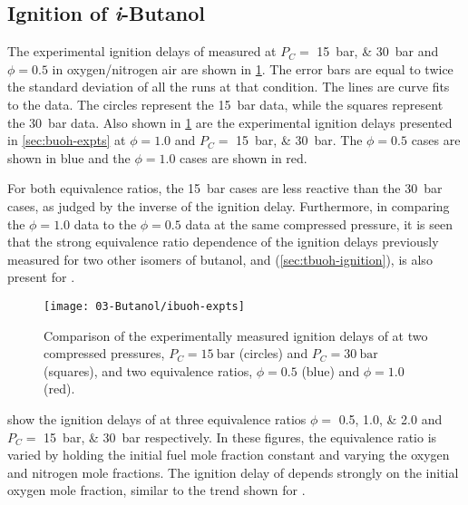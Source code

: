 \documentclass[../main.tex]{subfiles}
\begin{document}
\subsection{Ignition of \textit{i}-Butanol}
\label{sec:ibuoh-ignition}

The experimental ignition delays of \iBuOH{} measured at
$P_C=$ \SIlist{15;30}{\bar} and $\phi=0.5$ in oxygen/nitrogen air are shown in
\cref{fig:ibuoh-expts}. The error bars are equal to twice the standard
deviation of all the runs at that condition. The lines are curve fits to
the data. The circles represent the \SI{15}{\bar} data, while the
squares represent the \SI{30}{\bar} data. Also shown in
\cref{fig:ibuoh-expts} are the experimental ignition delays presented in
\cref{sec:buoh-expts} at $\phi=1.0$ and $P_C=$ \SIlist{15;30}{\bar}. The
$\phi=0.5$ cases are shown in blue and the $\phi=1.0$ cases are shown in
red.

For both equivalence ratios, the \SI{15}{\bar} cases are less reactive
than the \SI{30}{\bar} cases, as judged by the inverse of the
ignition delay. Furthermore, in comparing the $\phi=1.0$ data to the
$\phi=0.5$ data at the same compressed pressure, it is seen that the
strong equivalence ratio dependence of the ignition delays previously
measured for two other isomers of butanol, \nBuOH{} \cite{Weber2011} and
\tBuOH{} (\cref{sec:tbuoh-ignition}), is also present for \iBuOH{}.

\begin{figure}
\texttt{[image: 03-Butanol/ibuoh-expts]}
\caption{Comparison of the experimentally measured ignition delays of
         \iBuOH{} at two compressed pressures, $P_C=\SI{15}{\bar}$
         (circles) and $P_C=\SI{30}{\bar}$ (squares), and two equivalence
         ratios, $\phi=0.5$ (blue) and $\phi=1.0$ (red).}
\label{fig:ibuoh-expts}
\end{figure}

 show the ignition delays of
\iBuOH{} at three equivalence ratios $\phi=$ \numlist{0.5;1.0;2.0} and
$P_C=$ \SIlist{15;30}{\bar} respectively. In these figures, the equivalence
ratio is varied by holding the initial fuel mole fraction constant and
varying the oxygen and nitrogen mole fractions. The ignition delay
of \iBuOH{} depends strongly on the initial oxygen mole fraction, similar
to the trend shown for \nBuOH{} \cite{Weber2011,Zhu2014}.
\end{document}
